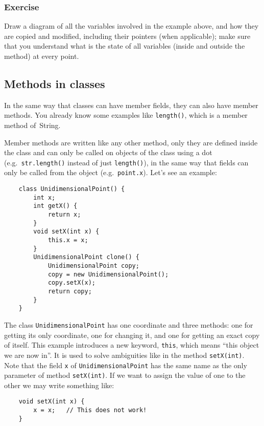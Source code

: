 \subsubsection{Exercise}
\label{sec:exerciseff}

Draw a diagram of all the variables involved in the example above, 
and how they are copied and modified, including their pointers (when
applicable); 
make sure that you understand what is the state of all variables
(inside and outside the method) at every point. 

\subsection{Methods in classes}
\label{sec:methods-classes}

In the same way that classes can have member fields, they can also have
member methods. You already know some examples like \verb+length()+,
which is a member method of~String. 

Member methods are written like any other method, only they are
defined inside the class and can only be called on objects of the
class using a dot (e.g.~\verb+str.length()+ instead 
of just \verb+length()+), 
in the same way that fields can only
be called from the object (e.g.~\verb+point.x+). Let's see an example: 

\begin{verbatim}
    class UnidimensionalPoint() {
        int x;
        int getX() {
            return x;
        }
        void setX(int x) {
            this.x = x;
        }
        UnidimensionalPoint clone() {
            UnidimensionalPoint copy;
            copy = new UnidimensionalPoint();
            copy.setX(x);
            return copy;
        }
    }
\end{verbatim}

The class \verb+UnidimensionalPoint+ has one coordinate and three
methods: one for getting its only coordinate, one for changing it, and
one for getting an exact copy of itself. This example introduces a new
keyword, \verb+this+, which means ``this object we are now in''. It is
used to solve ambiguities like in the method \verb+setX(int)+. Note
that the field \verb+x+ of \verb+UnidimensionalPoint+ has the same
name as the only parameter of method \verb+setX(int)+. If we want to
assign the value of one to the other we may write something like: 

\begin{verbatim}
    void setX(int x) {
        x = x;   // This does not work!
    }
\end{verbatim}

